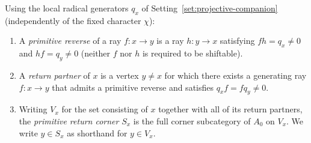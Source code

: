 \begin{definition}
\label{def:primitive-return-corner}
Using the local radical generators $q_x$ of Setting~\ref{set:projective-companion} (independently of the fixed character $\chi$):
\begin{enumerate}[label={\upshape(\arabic*)}]
\item A \emph{primitive reverse} of a ray $f\colon x\to y$ is a ray $h\colon y\to x$ satisfying $fh=q_x\ne0$ and $hf=q_y\ne0$ (neither $f$ nor $h$ is required to be shiftable).
\item A \emph{return partner} of $x$ is a vertex $y\ne x$ for which there exists a generating ray $f\colon x\to y$ that admits a primitive reverse and satisfies $q_xf=fq_y\ne0$.
\item Writing $V_x$ for the set consisting of $x$ together with all of its return partners, the \emph{primitive return corner} $S_x$ is the full corner subcategory of $A_0$ on $V_x$. We write $y\in S_x$ as shorthand for $y\in V_x$.
\end{enumerate}
\end{definition}

